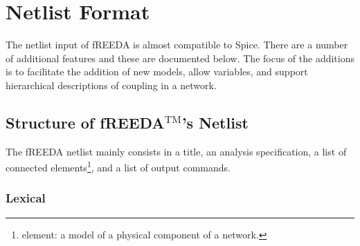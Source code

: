 
\chapter{Netlist Format} \label{ch_netlist}

The netlist input of fREEDA is almost compatible to Spice.  There are
a number of additional features and these are documented below.  The
focus of the additions is to facilitate the addition of new models,
allow variables, and support hierarchical descriptions of coupling in
a network.

\section{Structure of fREEDA$^{\mathrm{TM}}$'s Netlist}

The fREEDA netlist mainly consists in a title, an analysis
specification, a list of connected elements\footnote{element: a model
of a physical component of a network.}, and a list of output commands.

\subsection{Lexical}

